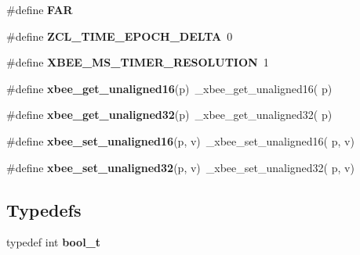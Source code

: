 \begin{DoxyCompactItemize}
\mbox{\label{group__hal__kl25_gaef060b3456fdcc093a7210a762d5f2ed}} 
\#define {\bfseries F\+AR}
\item 
\mbox{\label{group__hal__kl25_ga503caf44f78cc52dc196c413cd6c78ab}} 
\#define {\bfseries Z\+C\+L\+\_\+\+T\+I\+M\+E\+\_\+\+E\+P\+O\+C\+H\+\_\+\+D\+E\+L\+TA}~0
\item 
\mbox{\label{group__hal__kl25_ga5cbeea4d9344138b657f78ad38813584}} 
\#define {\bfseries X\+B\+E\+E\+\_\+\+M\+S\+\_\+\+T\+I\+M\+E\+R\+\_\+\+R\+E\+S\+O\+L\+U\+T\+I\+ON}~1
\item 
\mbox{\label{group__hal__kl25_ga844d3ad124d3502c66cac1ce2f86ca72}} 
\#define {\bfseries xbee\+\_\+get\+\_\+unaligned16}(p)~\+\_\+xbee\+\_\+get\+\_\+unaligned16( p)
\item 
\mbox{\label{group__hal__kl25_ga05636feff360b2e024a0db267aedf104}} 
\#define {\bfseries xbee\+\_\+get\+\_\+unaligned32}(p)~\+\_\+xbee\+\_\+get\+\_\+unaligned32( p)
\item 
\mbox{\label{group__hal__kl25_gae93bd4533f7f7e0dd4cbc54d2760030e}} 
\#define {\bfseries xbee\+\_\+set\+\_\+unaligned16}(p,  v)~\+\_\+xbee\+\_\+set\+\_\+unaligned16( p, v)
\item 
\mbox{\label{group__hal__kl25_gac083bd862aa3f6258437adba422de4ce}} 
\#define {\bfseries xbee\+\_\+set\+\_\+unaligned32}(p,  v)~\+\_\+xbee\+\_\+set\+\_\+unaligned32( p, v)
\end{DoxyCompactItemize}
\subsection*{Typedefs}
\begin{DoxyCompactItemize}
\item 
\mbox{\label{group__hal__kl25_ga812d16e5494522586b3784e55d479912}} 
typedef int {\bfseries bool\+\_\+t}
\end{DoxyCompactItemize}
